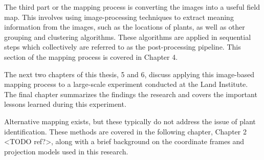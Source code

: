 The third part or the mapping process is converting the images into a useful field map.  This involves using image-processing techniques to extract meaning information from the images, such as the locations of plants, as well as other grouping and clustering algorithms.  These algorithms are applied in sequential steps which collectively are referred to as the post-processing pipeline.  This section of the mapping process is covered in Chapter 4. 

The next two chapters of this thesis, 5 and 6, discuss applying this image-based mapping process to a large-scale experiment conducted at the Land Institute.  The final chapter summarizes the findings the research and covers the important lessons learned during this experiment.

Alternative mapping exists, but these typically do not address the issue of plant identification.  These methods are covered in the following chapter, Chapter 2 <TODO ref?>, along with a brief background on the coordinate frames and projection models used in this research.